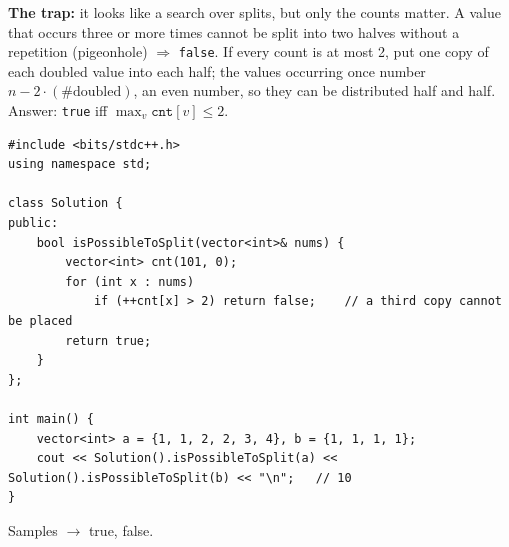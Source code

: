 \begin{solutionbox}
\textbf{The trap:} it looks like a search over splits, but only the counts matter. A value that occurs three or more times cannot be split into two halves without a repetition (pigeonhole) $\Rightarrow$ \texttt{false}. If every count is at most 2, put one copy of each doubled value into each half; the values occurring once number $n - 2\cdot(\#\text{doubled})$, an even number, so they can be distributed half and half. Answer: \texttt{true} iff $\max_v \texttt{cnt}[v] \le 2$.
\begin{lstlisting}[style=cpp]
#include <bits/stdc++.h>
using namespace std;

class Solution {
public:
    bool isPossibleToSplit(vector<int>& nums) {
        vector<int> cnt(101, 0);
        for (int x : nums)
            if (++cnt[x] > 2) return false;    // a third copy cannot be placed
        return true;
    }
};

int main() {
    vector<int> a = {1, 1, 2, 2, 3, 4}, b = {1, 1, 1, 1};
    cout << Solution().isPossibleToSplit(a) << Solution().isPossibleToSplit(b) << "\n";   // 10
}
\end{lstlisting}
Samples $\to$ true, false.
\end{solutionbox}

